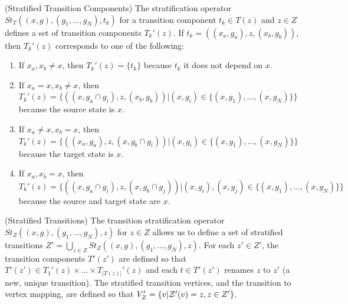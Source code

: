 \begin{definition} (Stratified Transition Components)
	The  stratification operator $St_{T}((x, g), (g_1, \ldots, g_N), t_k)$ for a transition component $t_k \in T(z)$ and $z \in Z$ defines a set of transition components $T_k'(z)$.  If $t_k = ((x_a, g_a), z, (x_b, g_b))$, then $T_k'(z)$ corresponds to one of the following:
	\begin{enumerate}
		\item If $x_a, x_b \not= x$, then $T_k'(z)=\{t_k\}$ because $t_k$ it does not depend on $x$.
		\item If $x_a = x, x_b \not= x$, then  $T_k'(z)=\{((x, g_a\cap g_i), z, (x_b, g_b))| (x,g_i) \in \{(x, g_1),\ldots, (x, g_N)\}\}$ because the source state is $x$.
		\item If $x_a \not= x, x_b = x$, then $T_k'(z)= \{((x_a, g_a), z, (x, g_b\cap g_i))| (x,g_i) \in \{(x, g_1),\ldots, (x, g_N)\}\}$ because the target state is $x$.
		\item If $x_a,x_b = x$, then $T_k'(z)= \{((x, g_a\cap g_i), z, (x, g_b\cap g_j))| (x,g_i), (x,g_j) \in \{(x, g_1),\ldots, (x, g_N)\}\}$ because the source and target state are $x$.
	\end{enumerate}
\end{definition}

\begin{definition}(Stratified Transitions)
	The transition stratification operator $St_{Z}((x, g), (g_1, \ldots, g_N), z)$ for $z \in Z$ allows us to define a set of stratified transitions $Z' = \bigcup_{z \in Z} St_{Z}((x, g), (g_1, \ldots, g_N), z)$. For each $z'\in Z'$, the transition components $T'(z')$ are defined so that $T'(z') \in T_1'(z) \times \ldots \times T_{|T(z)|}'(z)$ and each $t \in T'(z')$ renames $z$ to $z'$ (a new, unique transition).  The stratified transition vertices, and the transition to vertex mapping, are defined so that $V_Z' = \{v | {\cal Z}'(v) = z, z \in Z'\}$.
\end{definition}

